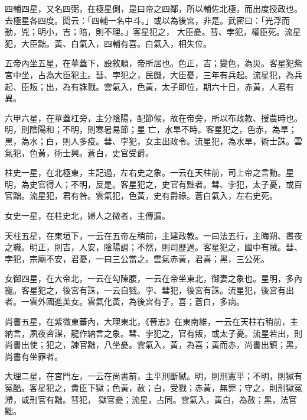 \begin{pinyinscope}
 四輔四星，又名四弼，在極星側，是曰帝之四鄰，所以輔佐北極，而出度授政也。去極星各四度。閎云：「四輔一名中斗。」或以為後宮，非是。武密曰：「光浮而動，兇；明小，吉；暗，則不理。」客星犯之，
 大臣憂。彗、孛犯，權臣死。流星犯，大臣黜。黃、白氣入，四輔有喜。白氣入，相失位。



 五帝內坐五星，在華蓋下，設敘順，帝所居也。色正，吉；變色，為災。客星犯紫宮中坐，占為大臣犯主。彗、孛犯之，民饑，大臣憂，三年有兵起。流星犯，為兵起、臣叛；出，為有誅戮。雲氣入，色黃，太子即位，期六十日，赤黃，人君有異。



 六甲六星，在華蓋杠旁，主分陰陽，配節候，故在帝旁，所以布政教、授農時也。明，則陰陽和；不明，則寒暑易節；星
 亡，水旱不時。客星犯之，色赤，為旱；黑，為水；白，則人多疫。彗、孛犯，女主出政令。流星犯，為水旱，術士誅。雲氣犯，色黃，術士興。蒼白，史官受爵。



 柱史一星，在北極東，主記過，左右史之象。一云在天柱前，司上帝之言動。星明，為史官得人；不明，反是。客星犯之，史官有黜者。彗、孛犯，太子憂，或百官黜。流星犯，君有咎。雲氣犯，色黃，史有爵祿。蒼白氣入，左右史死。



 女史一星，在柱史北，婦人之微者，主傳漏。



 天柱五星，在東垣下，一云在五帝左稍前，主建政教。一曰法五行，主晦朔、晝夜之職。明正，則吉，人安，陰陽調；不然，則司歷過。客星犯之，國中有賊。彗、孛犯，宗廟不安，君憂，一曰三公當之。雲氣赤黃，君喜；黑，三公死。



 女御四星，在大帝北，一云在勾陳腹，一云在帝坐東北，御妻之象也。星明，多內寵。客星犯之，後宮有誅，一云自戮。孛、彗犯，後宮有誅。流星犯，後宮有出者。一雲外國進美女。雲氣化黃，為後宮有子，喜；蒼白，多病。



 尚書五星，在紫微東蕃內，大理東北，《晉志》在東南維，一云在天柱右稍前，主納言，夙夜咨謀，龍作納言之象。彗、孛犯之，官有叛，或太子憂。流星若出，則尚書出使；犯之，諫官黜，八坐憂。雲氣入，黃，為喜；黃而赤，尚書出鎮；黑，尚書有坐罪者。



 大理二星，在宮門左，一云在尚書前，主平刑斷獄。明，則刑憲平；不明，則獄有冤酷。客星犯之，貴臣下獄；色黃，赦；白，受戮；赤黃，無罪；守之，則刑獄冤滯，或刑官有黜。彗犯，
 獄官憂；流星，占同。雲氣入，黃白，為赦；黑，法官黜。




\end{pinyinscope}

